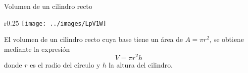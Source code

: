 
\begin{infocard}{Volumen de un cilindro recto}
    \begin{wrapfigure}{r}{0.25\linewidth}
        \centering
        \texttt{[image: ../images/LpV1W]}
    \end{wrapfigure}
    El volumen de un cilindro recto cuya base tiene un área de $A=\pi r^2$, se obtiene mediante la expresión
    \[  V = \pi r^2h  \]
    donde $r$ es el radio del círculo y $h$ la altura del cilindro.
\end{infocard}
